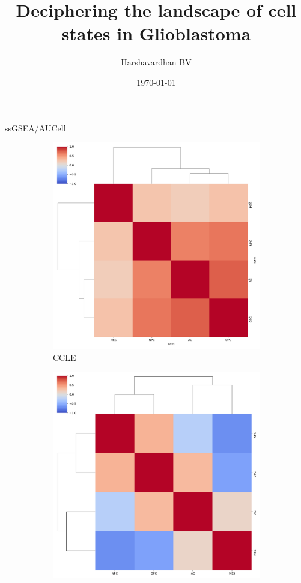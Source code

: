 \documentclass[aspectratio=169,9pt]{beamer}
\title{Deciphering the landscape of cell states in Glioblastoma}
\author{Harshavardhan BV}
\date{\today}
\institute{IISc Bangalore}
\begin{document}
    \frame{\titlepage}

    \begin{frame}{ssGSEA/AUCell}
        \begin{adjustwidth}{-5cm}{-5cm}
            \centering
            \begin{figure}
                \centering
                \begin{subfigure}[b]{0.38\textwidth}
                    \centering
                    \includegraphics[width=\textwidth]{CCLE_ssgsea_corr_4D}
                    \caption{CCLE}
                \end{subfigure}
                \begin{subfigure}[b]{0.38\textwidth}
                    \centering
                    \includegraphics[width=\textwidth]{AUCell_GSM3828672_corrplot_4D}

\end{subfigure}
\end{figure}
\end{adjustwidth}
\end{frame}
\end{document}
